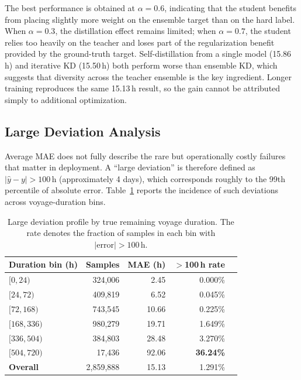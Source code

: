 \documentclass[conference]{IEEEtran}
\begin{document}
The best performance is obtained at $\alpha = 0.6$, indicating that the student benefits from placing slightly more weight on the ensemble target than on the hard label. When $\alpha = 0.3$, the distillation effect remains limited; when $\alpha = 0.7$, the student relies too heavily on the teacher and loses part of the regularization benefit provided by the ground-truth target. Self-distillation from a single model (15.86\,h) and iterative KD (15.50\,h) both perform worse than ensemble KD, which suggests that diversity across the teacher ensemble is the key ingredient. Longer training reproduces the same 15.13\,h result, so the gain cannot be attributed simply to additional optimization.

\subsection{Large Deviation Analysis}
\label{sec:large_dev}

Average MAE does not fully describe the rare but operationally costly failures that matter in deployment. A ``large deviation'' is therefore defined as $|\hat{y} - y| > 100$\,h (approximately 4 days), which corresponds roughly to the 99th percentile of absolute error. Table~\ref{tab:large_dev_profile} reports the incidence of such deviations across voyage-duration bins.

\begin{table}[t]
    \centering
    \caption{Large deviation profile by true remaining voyage duration. The rate denotes the fraction of samples in each bin with $|\text{error}| > 100$\,h.}
    \label{tab:large_dev_profile}
    \begin{tabular}{lrrrr}
        \toprule
        \textbf{Duration bin (h)} & \textbf{Samples} & \textbf{MAE (h)} & \textbf{$>$100\,h rate} \\
        \midrule
        $[0, 24)$     & 324,006  & 2.45  & 0.000\% \\
        $[24, 72)$    & 409,819  & 6.52  & 0.045\% \\
        $[72, 168)$   & 743,545  & 10.66 & 0.225\% \\
        $[168, 336)$  & 980,279  & 19.71 & 1.649\% \\
        $[336, 504)$  & 384,803  & 28.48 & 3.270\% \\
        $[504, 720)$  & 17,436   & 92.06 & \textbf{36.24\%} \\
        \midrule
        \textbf{Overall}  & 2,859,888 & 15.13 & 1.291\% \\
        \bottomrule
    \end{tabular}
\end{table}
\end{document}
